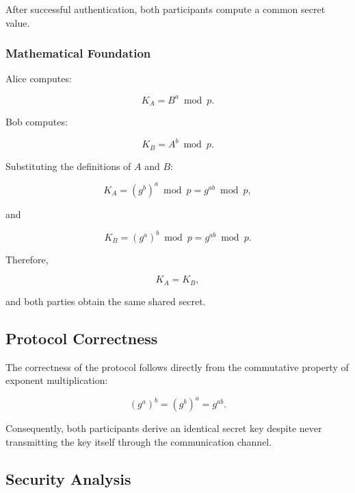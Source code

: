 \documentclass[12pt]{article}
\begin{document}
After successful authentication, both participants compute a common secret
value.

\subsubsection{Mathematical Foundation}

Alice computes:

\begin{equation}
K_A = B^a \bmod p.
\end{equation}

Bob computes:

\begin{equation}
K_B = A^b \bmod p.
\end{equation}

Substituting the definitions of $A$ and $B$:

\begin{equation}
K_A
=
(g^b)^a
\bmod p
=
g^{ab}
\bmod p,
\end{equation}

and

\begin{equation}
K_B
=
(g^a)^b
\bmod p
=
g^{ab}
\bmod p.
\end{equation}

Therefore,

\begin{equation}
K_A = K_B,
\end{equation}

and both parties obtain the same shared secret.


\subsection{Protocol Correctness}

The correctness of the protocol follows directly from the commutative property
of exponent multiplication:

\begin{equation}
(g^a)^b
=
(g^b)^a
=
g^{ab}.
\end{equation}

Consequently, both participants derive an identical secret key despite never
transmitting the key itself through the communication channel.


\subsection{Security Analysis}
\end{document}
